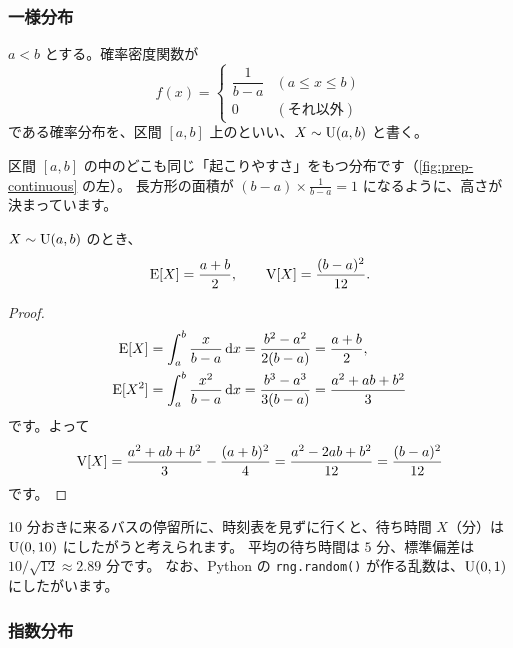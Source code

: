 \subsubsection*{一様分布}

\begin{definition}
  $a < b$ とする。確率密度関数が
  \[
    f(x) = \begin{cases} \dfrac{1}{b - a} & (a \le x \le b) \\[2mm] 0 & (\text{それ以外}) \end{cases}
  \]
  である確率分布を、区間 $[a, b]$ 上のといい、$X \sim \mathrm{U}(a, b)$ と書く。
\end{definition}

区間 $[a, b]$ の中のどこも同じ「起こりやすさ」をもつ分布です（\cref{fig:prep-continuous} の左）。
長方形の面積が $(b - a) \times \frac{1}{b-a} = 1$ になるように、高さが決まっています。

\begin{proposition}
  $X \sim \mathrm{U}(a, b)$ のとき、
  \[
    \mathrm{E}[X] = \frac{a + b}{2}, \qquad \mathrm{V}[X] = \frac{(b - a)^2}{12}.
  \]
\end{proposition}

\begin{proof}
  \begin{align*}
    \mathrm{E}[X] &= \int_a^b \frac{x}{b - a} \mathop{}\!\mathrm{d} x = \frac{b^2 - a^2}{2(b - a)} = \frac{a + b}{2}, \\
    \mathrm{E}[X^2] &= \int_a^b \frac{x^2}{b - a} \mathop{}\!\mathrm{d} x = \frac{b^3 - a^3}{3(b - a)} = \frac{a^2 + ab + b^2}{3}
  \end{align*}
  です。よって
  \[
    \mathrm{V}[X] = \frac{a^2 + ab + b^2}{3} - \frac{(a + b)^2}{4} = \frac{a^2 - 2ab + b^2}{12} = \frac{(b - a)^2}{12}
  \]
  です。
\end{proof}

\begin{example}[バスの待ち時間][ex:uniform]
  10 分おきに来るバスの停留所に、時刻表を見ずに行くと、待ち時間 $X$（分）は $\mathrm{U}(0, 10)$ にしたがうと考えられます。
  平均の待ち時間は $5$ 分、標準偏差は $10/\sqrt{12} \approx 2.89$ 分です。
  なお、Python の \texttt{rng.random()} が作る乱数は、$\mathrm{U}(0, 1)$ にしたがいます。
\end{example}

\subsubsection*{指数分布}

